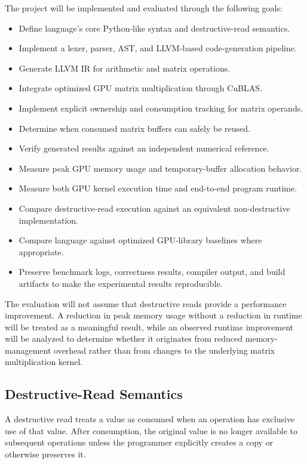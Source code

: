 \documentclass[a4paper]{article}
\begin{document}
	The project will be implemented and evaluated through the following goals:
	
	\begin{itemize}
		\item Define language's core Python-like syntax and destructive-read semantics.
		\item Implement a lexer, parser, AST, and LLVM-based code-generation pipeline.
		\item Generate LLVM IR for arithmetic and matrix operations.
		\item Integrate optimized GPU matrix multiplication through CuBLAS.
		\item Implement explicit ownership and consumption tracking for matrix operands.
		\item Determine when consumed matrix buffers can safely be reused.
		\item Verify generated results against an independent numerical reference.
		\item Measure peak GPU memory usage and temporary-buffer allocation behavior.
		\item Measure both GPU kernel execution time and end-to-end program runtime.
		\item Compare destructive-read execution against an equivalent non-destructive implementation.
		\item Compare language against optimized GPU-library baselines where appropriate.
		\item Preserve benchmark logs, correctness results, compiler output, and build artifacts to make the experimental results reproducible.
	\end{itemize}
	
	The evaluation will not assume that destructive reads provide a performance improvement. A reduction in peak memory usage without a reduction in runtime will be treated as a meaningful result, while an observed runtime improvement will be analyzed to determine whether it originates from reduced memory-management overhead rather than from changes to the underlying matrix multiplication kernel.
	
	\subsection{Destructive-Read Semantics}
	
	A destructive read treats a value as consumed when an operation has exclusive use of that value. After consumption, the original value is no longer available to subsequent operations unless the programmer explicitly creates a copy or otherwise preserves it.
	
\end{document}
